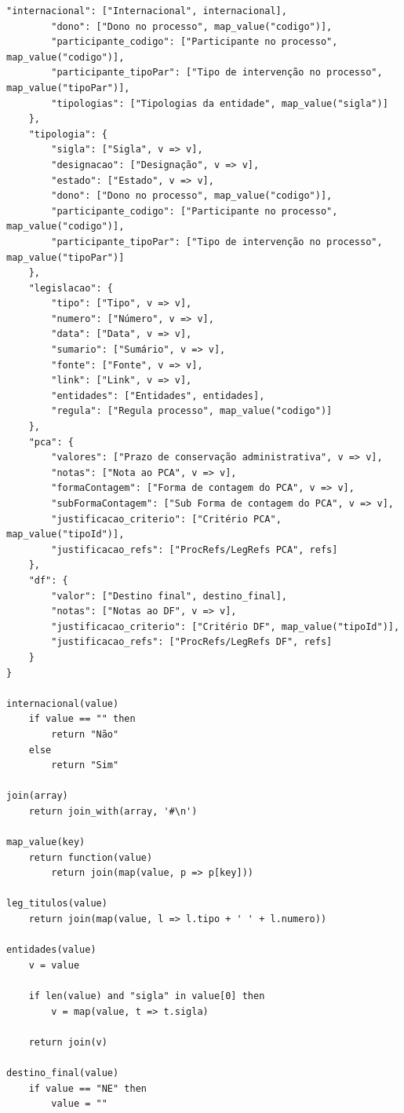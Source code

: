 \begin{lstlisting}[language=pseudocode, caption=Algorítmo de conversão de \acrshort{json} para \acrshort{csv}]
        "internacional": ["Internacional", internacional],
        "dono": ["Dono no processo", map_value("codigo")],
        "participante_codigo": ["Participante no processo", map_value("codigo")],
        "participante_tipoPar": ["Tipo de intervenção no processo", map_value("tipoPar")],
        "tipologias": ["Tipologias da entidade", map_value("sigla")]
    },
    "tipologia": {
        "sigla": ["Sigla", v => v],
        "designacao": ["Designação", v => v],
        "estado": ["Estado", v => v],
        "dono": ["Dono no processo", map_value("codigo")],
        "participante_codigo": ["Participante no processo", map_value("codigo")],
        "participante_tipoPar": ["Tipo de intervenção no processo", map_value("tipoPar")]
    },
    "legislacao": {
        "tipo": ["Tipo", v => v],
        "numero": ["Número", v => v],
        "data": ["Data", v => v],
        "sumario": ["Sumário", v => v],
        "fonte": ["Fonte", v => v],
        "link": ["Link", v => v],
        "entidades": ["Entidades", entidades],
        "regula": ["Regula processo", map_value("codigo")]
    },
    "pca": {
        "valores": ["Prazo de conservação administrativa", v => v],
        "notas": ["Nota ao PCA", v => v],
        "formaContagem": ["Forma de contagem do PCA", v => v],
        "subFormaContagem": ["Sub Forma de contagem do PCA", v => v],
        "justificacao_criterio": ["Critério PCA", map_value("tipoId")],
        "justificacao_refs": ["ProcRefs/LegRefs PCA", refs]
    },
    "df": {
        "valor": ["Destino final", destino_final],
        "notas": ["Notas ao DF", v => v],
        "justificacao_criterio": ["Critério DF", map_value("tipoId")],
        "justificacao_refs": ["ProcRefs/LegRefs DF", refs]
    }
}

internacional(value)
    if value == "" then
        return "Não"
    else
        return "Sim"

join(array)
    return join_with(array, '#\n')

map_value(key)
    return function(value)
        return join(map(value, p => p[key]))

leg_titulos(value)
    return join(map(value, l => l.tipo + ' ' + l.numero))

entidades(value)
    v = value

    if len(value) and "sigla" in value[0] then
        v = map(value, t => t.sigla)

    return join(v)

destino_final(value)
    if value == "NE" then
        value = ""


\end{lstlisting}
